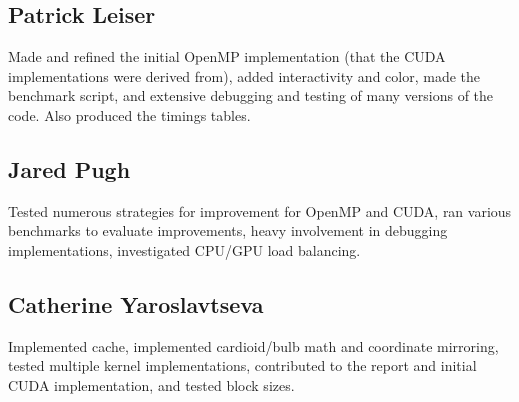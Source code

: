 \documentclass{article}
\begin{document}
\subsection{Patrick Leiser}
Made and refined the initial OpenMP implementation (that the CUDA implementations were derived from), added interactivity and color, made the benchmark script, and extensive debugging and testing of many versions of the code. Also produced the timings tables. 

\subsection{Jared Pugh}
Tested numerous strategies for improvement for OpenMP and CUDA, ran various benchmarks to evaluate improvements, heavy involvement in debugging implementations, investigated CPU/GPU load balancing.

\subsection{Catherine Yaroslavtseva}
Implemented cache, implemented cardioid/bulb math and coordinate mirroring, tested multiple kernel implementations, contributed to the report and initial CUDA implementation, and tested block sizes.
\end{document}
